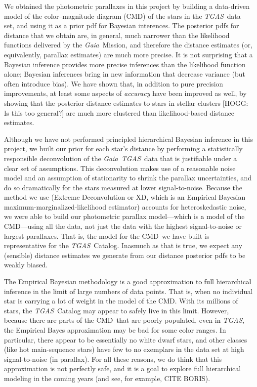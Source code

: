 \documentclass[12pt, preprint]{aastex6}
\newcommand{\acronym}[1]{{\small{#1}}}
\newcommand{\project}[1]{\textsl{#1}}
\newcommand{\tgas}{\project{\acronym{TGAS}}}
\newcommand{\gaia}{\project{Gaia}}
\newcommand{\xd}{\acronym{XD}}
\newcommand{\cmd}{\acronym{CMD}}
\begin{document}
We obtained the photometric parallaxes in this project
by building a data-driven model of the
color--magnitude diagram (\cmd) of the stars in the \tgas\ data set,
and using it as a prior pdf for Bayesian interences.
The posterior pdfs for distance that we obtain are, in general, much
narrower than the likelihood functions delivered by the
\gaia\ Mission, and therefore the distance estimates (or,
equivalently, parallax estimates) are much more precise.
It is not surprising that a Bayesian inference provides more
precise inferences than the likelihood function alone; Bayesian
inferences bring in new information that decrease variance (but
often introduce bias).
We have shown that, in addition to pure precision improvements, at
least some aspects of \emph{accuracy} have been improved as well, by
showing that the posterior distance estimates to stars in stellar
clusters [HOGG: Is this too general?] are much more clustered than likelihood-based distance
estimates.

Although we have not performed principled hierarchical Bayesian inference in this
project, we built our prior for each star's distance by
performing a statistically responsible deconvolution
of the \gaia\ \tgas\ data that is justifiable under a clear set of
assumptions.
This deconvolution makes use of a reasonable noise model and an
assumption of stationarity to shrink the parallax uncertainties, and
do so dramatically for the stars measured at lower signal-to-noise.
Because the method we use (Extreme Deconvolution or \xd, which is
an Empirical Bayesian maximum-marginalized-likelihood estimator) accounts for
heteroskedastic noise, we were able to build our photometric parallax
model---which is a model of the \cmd---using
all the data, not just the data with the highest signal-to-noise or
largest parallaxes.
That is, the model for the \cmd\ we have built is representative for
the \tgas\ Catalog.
Inasmuch as that is true, we expect any (sensible) distance estimates
we generate from our distance posterior pdfs to be weakly biased.

The Empirical Bayesian methodology is a good approximation to full
hierarchical inference in the limit of large numbers of data points.
That is, when no individual star is carrying a lot of weight in the
model of the \cmd.
With its millions of stars, the \tgas\ Catalog may appear to safely
live in this limit.
However, because there are parts of the \cmd\ that are poorly populated,
even in \tgas, the Empirical Bayes approximation may be bad for some
color ranges.
In particular, there appear to be essentially no white dwarf stars,
and other classes (like hot main-sequence stars) have few to no exemplars
in the data set at high signal-to-noise (in parallax).
For all these reasons, we do think that this approximation is not perfectly
safe, and it is a goal to explore full hierarchical modeling in the coming
years (and see, for example, CITE BORIS).
\end{document}
